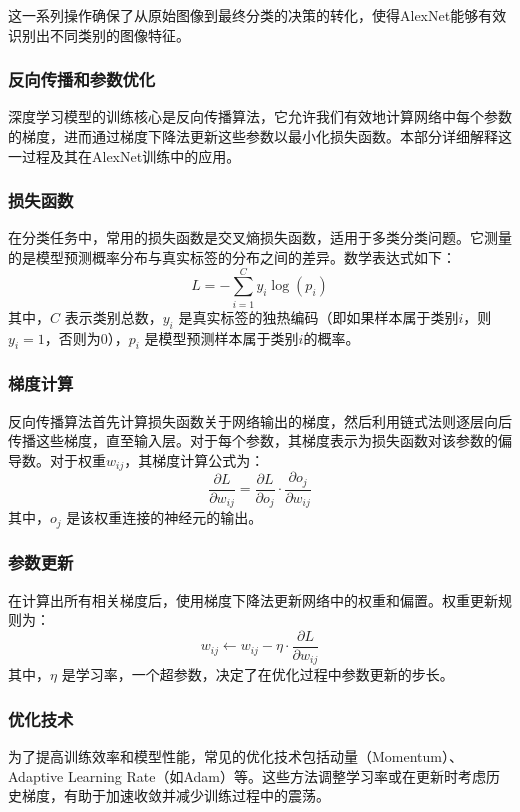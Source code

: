 \documentclass[a4paper,12pt]{article}
\begin{document}
这一系列操作确保了从原始图像到最终分类的决策的转化，使得AlexNet能够有效识别出不同类别的图像特征。


\subsubsection{反向传播和参数优化}
深度学习模型的训练核心是反向传播算法，它允许我们有效地计算网络中每个参数的梯度，进而通过梯度下降法更新这些参数以最小化损失函数。本部分详细解释这一过程及其在AlexNet训练中的应用。

\subsubsection*{损失函数}
在分类任务中，常用的损失函数是交叉熵损失函数，适用于多类分类问题。它测量的是模型预测概率分布与真实标签的分布之间的差异。数学表达式如下：
\begin{equation}
	L = -\sum_{i=1}^{C} y_i \log(p_i)
\end{equation}
其中，$C$ 表示类别总数，$y_i$ 是真实标签的独热编码（即如果样本属于类别$i$，则$y_i = 1$，否则为$0$），$p_i$ 是模型预测样本属于类别$i$的概率。

\subsubsection*{梯度计算}
反向传播算法首先计算损失函数关于网络输出的梯度，然后利用链式法则逐层向后传播这些梯度，直至输入层。对于每个参数，其梯度表示为损失函数对该参数的偏导数。对于权重$w_{ij}$，其梯度计算公式为：
\begin{equation}
	\frac{\partial L}{\partial w_{ij}} = \frac{\partial L}{\partial o_j} \cdot \frac{\partial o_j}{\partial w_{ij}}
\end{equation}
其中，$o_j$ 是该权重连接的神经元的输出。

\subsubsection*{参数更新}
在计算出所有相关梯度后，使用梯度下降法更新网络中的权重和偏置。权重更新规则为：
\begin{equation}
	w_{ij} \leftarrow w_{ij} - \eta \cdot \frac{\partial L}{\partial w_{ij}}
\end{equation}
其中，$\eta$ 是学习率，一个超参数，决定了在优化过程中参数更新的步长。

\subsubsection*{优化技术}
为了提高训练效率和模型性能，常见的优化技术包括动量（Momentum）、Adaptive Learning Rate（如Adam）等。这些方法调整学习率或在更新时考虑历史梯度，有助于加速收敛并减少训练过程中的震荡。
\end{document}
